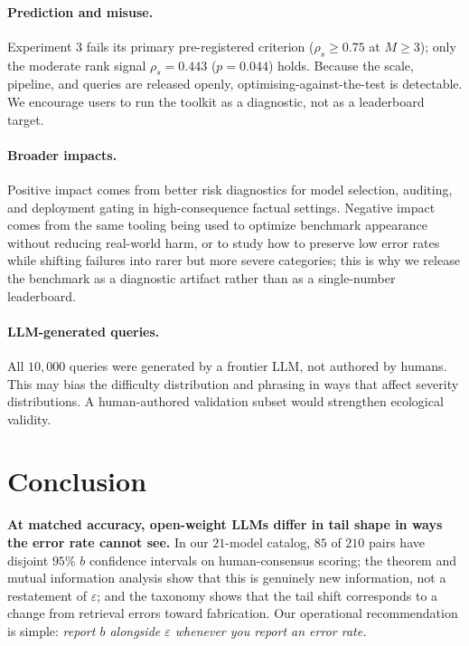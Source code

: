 \documentclass{article}
\newcommand{\sdi}{\ensuremath{b}}
\begin{document}
\paragraph{Prediction and misuse.} Experiment 3 fails its primary
pre-registered criterion ($\rho_s \geq 0.75$ at $M \geq 3$); only
the moderate rank signal $\rho_s = 0.443$ ($p = 0.044$) holds.
Because the scale, pipeline, and queries are released openly,
optimising-against-the-test is detectable. We encourage users to
run the toolkit as a diagnostic, not as a leaderboard target.

\paragraph{Broader impacts.} Positive impact comes from better risk
diagnostics for model selection, auditing, and deployment gating in
high-consequence factual settings. Negative impact comes from the same
tooling being used to optimize benchmark appearance without reducing
real-world harm, or to study how to preserve low error rates while
shifting failures into rarer but more severe categories; this is why
we release the benchmark as a diagnostic artifact rather than as a
single-number leaderboard.

\paragraph{LLM-generated queries.} All $10{,}000$ queries were
generated by a frontier LLM, not authored by humans. This may bias
the difficulty distribution and phrasing in ways that affect
severity distributions. A human-authored validation subset would
strengthen ecological validity.

\section{Conclusion}\label{sec:conclusion}

\textbf{At matched accuracy, open-weight LLMs differ in tail shape
in ways the error rate cannot see.} In our $21$-model catalog,
$85$ of $210$ pairs have disjoint $95\%$ \sdi{} confidence
intervals on human-consensus scoring; the theorem and mutual
information analysis show that this is genuinely new information,
not a restatement of $\varepsilon$; and the taxonomy shows that the
tail shift corresponds to a change from retrieval errors toward
fabrication. Our operational recommendation is simple:
\emph{report \sdi{} alongside $\varepsilon$ whenever you report an
error rate.}
\end{document}
